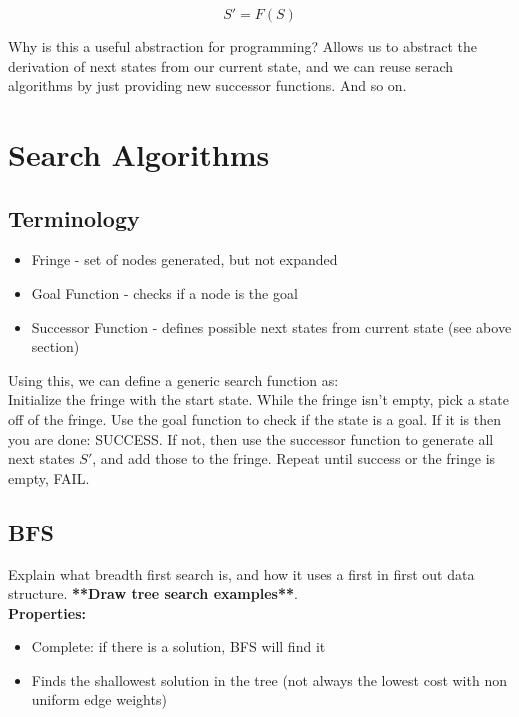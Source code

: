 \documentclass[letterpaper]{article} %
\begin{document}
$$S' = F(S)$$

\noindent
Why is this a useful abstraction for programming? Allows us to abstract the derivation of next states from our current state, and we can reuse serach algorithms by just providing new successor functions. And so on.

\section{Search Algorithms}

\subsection{Terminology}

\begin{itemize}
	\item Fringe - set of nodes generated, but not expanded
	\item Goal Function - checks if a node is the goal
	\item Successor Function - defines possible next states from current state (see above section)
\end{itemize}

\noindent
Using this, we can define a generic search function as:\\

\noindent
Initialize the fringe with the start state. While the fringe isn't empty, pick a state off of the fringe. Use the goal function to check if the state is a goal. If it is then you are done: SUCCESS. If not, then use the successor function to generate all next states $S'$, and add those to the fringe. Repeat until success or the fringe is empty, FAIL.

\subsection{BFS}

Explain what breadth first search is, and how it uses a first in first out data structure. \textbf{**Draw tree search examples**}.\\

\textbf{Properties:}

\begin{itemize}
	\item Complete: if there is a solution, BFS will find it
	\item Finds the shallowest solution in the tree (not always the lowest cost with non uniform edge weights)
\end{itemize}
\end{document}
